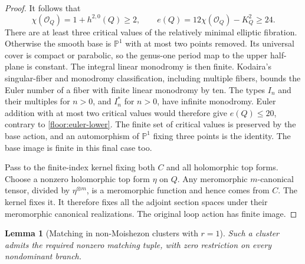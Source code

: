 \documentclass[11pt,letterpaper]{article}
\newtheorem{lemma}[theorem]{Lemma}
\theoremstyle{definition}
\theoremstyle{remark}
\begin{document}
\begin{proof}
It follows that
\begin{equation}
 \label{floor:euler-lower}
 \chi(\mathcal{O}_Q)=1+h^{2,0}(Q)\ge2,
 \qquad e(Q)=12\chi(\mathcal{O}_Q)-K_Q^2\ge24.
\end{equation}
There are at least three critical values of the relatively
minimal elliptic fibration.  Otherwise the smooth base is
$\mathbb{P}^1$ with at most two points removed.  Its universal cover
is compact or parabolic, so the genus-one period map to the
upper half-plane is constant.  The integral linear monodromy
is then finite.  Kodaira's singular-fiber and monodromy
classification, including multiple fibers, bounds the Euler
number of a fiber with finite linear monodromy by ten.
The types $I_n$ and their multiples for $n>0$, and $I_n^*$
for $n>0$, have infinite monodromy.  Euler addition with at
most two critical values would therefore give $e(Q)\le20$,
contrary to \eqref{floor:euler-lower}.  The finite set of
critical values is preserved by the base action, and an
automorphism of $\mathbb{P}^1$ fixing three points is the identity.
The base image is finite in this final case too.

Pass to the finite-index kernel fixing both $C$ and all
holomorphic top forms.  Choose a nonzero holomorphic top form
$\eta$ on $Q$.  Any meromorphic $m$-canonical tensor, divided
by $\eta^{\otimes m}$, is a meromorphic function and hence
comes from $C$.  The kernel fixes it.  It therefore fixes all
the adjoint section spaces under their meromorphic canonical
realizations.  The original loop action has finite image.
\end{proof}

\begin{lemma}[Matching in non-Moishezon clusters with $r=1$]
\label{floor:nonprojective-r1}
Such a cluster admits the required nonzero matching tuple,
with zero restriction on every nondominant branch.
\end{lemma}
\end{document}
